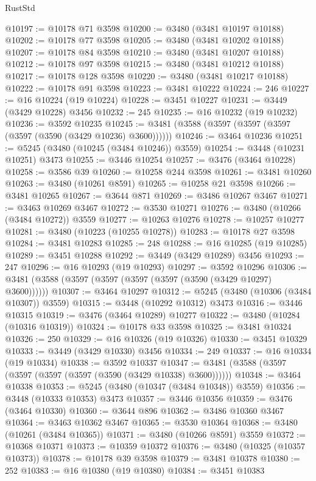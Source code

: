 \begin{lexlean}{RustStd}
\begin{coremodule}
{\begin{coremodule}
{{{{{{{{{{{{{{{{{{{{{{{{{{{{{{{{{{{{{{{{{{{{{{{{{{{{{{{{{{{{{{{{{{{{{{{{{{{{{{{{{{{{{@10197 := @10178 @71 @3598
@10200 := @3480 (@3481 @10197 @10188)
@10202 := @10178 @77 @3598
@10205 := @3480 (@3481 @10202 @10188)
@10207 := @10178 @84 @3598
@10210 := @3480 (@3481 @10207 @10188)
@10212 := @10178 @97 @3598
@10215 := @3480 (@3481 @10212 @10188)
@10217 := @10178 @128 @3598
@10220 := @3480 (@3481 @10217 @10188)
@10222 := @10178 @91 @3598
@10223 := @3481 @10222
@10224 := 246
@10227 := @16 @10224 (@19 @10224)
@10228 := @3451 @10227
@10231 := @3449 (@3429 @10228) @3456
@10232 := 245
@10235 := @16 @10232 (@19 @10232)
@10236 := @3592 @10235
@10245 := @3481 (@3588 (@3597 (@3597 (@3597 (@3597 (@3590 (@3429 @10236) @3600))))))
@10246 := @3464 @10236
@10251 := @5245 (@3480 (@10245 (@3484 @10246)) @3559)
@10254 := @3448 (@10231 @10251) @3473
@10255 := @3446 @10254
@10257 := @3476 (@3464 @10228)
@10258 := @3586 @39
@10260 := @10258 @244 @3598
@10261 := @3481 @10260
@10263 := @3480 (@10261 @8591)
@10265 := @10258 @21 @3598
@10266 := @3481 @10265
@10267 := @3644 @871
@10269 := @3486 @10267 @3467
@10271 := @3463 @10269 @3467
@10272 := @3530 @10271
@10276 := @3480 (@10266 (@3484 @10272)) @3559
@10277 := @10263 @10276
@10278 := @10257 @10277
@10281 := @3480 (@10223 (@10255 @10278))
@10283 := @10178 @27 @3598
@10284 := @3481 @10283
@10285 := 248
@10288 := @16 @10285 (@19 @10285)
@10289 := @3451 @10288
@10292 := @3449 (@3429 @10289) @3456
@10293 := 247
@10296 := @16 @10293 (@19 @10293)
@10297 := @3592 @10296
@10306 := @3481 (@3588 (@3597 (@3597 (@3597 (@3597 (@3590 (@3429 @10297) @3600))))))
@10307 := @3464 @10297
@10312 := @5245 (@3480 (@10306 (@3484 @10307)) @3559)
@10315 := @3448 (@10292 @10312) @3473
@10316 := @3446 @10315
@10319 := @3476 (@3464 @10289) @10277
@10322 := @3480 (@10284 (@10316 @10319))
@10324 := @10178 @33 @3598
@10325 := @3481 @10324
@10326 := 250
@10329 := @16 @10326 (@19 @10326)
@10330 := @3451 @10329
@10333 := @3449 (@3429 @10330) @3456
@10334 := 249
@10337 := @16 @10334 (@19 @10334)
@10338 := @3592 @10337
@10347 := @3481 (@3588 (@3597 (@3597 (@3597 (@3597 (@3590 (@3429 @10338) @3600))))))
@10348 := @3464 @10338
@10353 := @5245 (@3480 (@10347 (@3484 @10348)) @3559)
@10356 := @3448 (@10333 @10353) @3473
@10357 := @3446 @10356
@10359 := @3476 (@3464 @10330)
@10360 := @3644 @896
@10362 := @3486 @10360 @3467
@10364 := @3463 @10362 @3467
@10365 := @3530 @10364
@10368 := @3480 (@10261 (@3484 @10365))
@10371 := @3480 (@10266 @8591) @3559
@10372 := @10368 @10371
@10373 := @10359 @10372
@10376 := @3480 (@10325 (@10357 @10373))
@10378 := @10178 @39 @3598
@10379 := @3481 @10378
@10380 := 252
@10383 := @16 @10380 (@19 @10380)
@10384 := @3451 @10383
}}}}}}}}}}}}}}}}}}}}}}}}}}}}}}}}}}}}}}}}}}}}}}}}}}}}}}}}}}}}}}}}}}}}}}}}}}}}}}}}}}}}}
\end{coremodule}}
\end{coremodule}
\end{lexlean}
